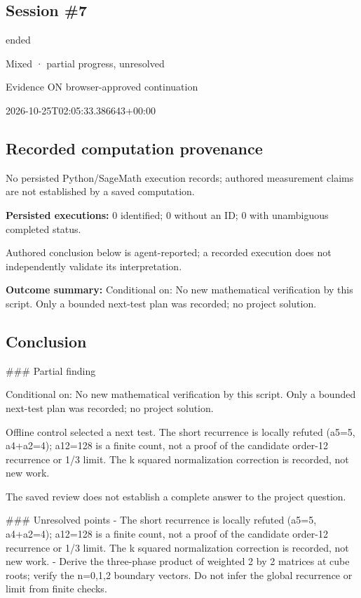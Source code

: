 \documentclass[11pt]{article}
\begin{document}
\subsection{Session \#7}
\begin{description}[style=nextline,font=\normalfont\bfseries,leftmargin=0pt,labelsep=0pt]
\item[Execution status] ended
\item[Outcome] Mixed · partial progress, unresolved
\item[Strategy] Evidence ON browser-approved continuation
\item[Started] 2026-10-25T02:05:33.386643+00:00
\end{description}
\subsection{Recorded computation provenance}
No persisted Python/SageMath execution records; authored measurement claims are not established by a saved computation.\par
\textbf{Persisted executions:} 0 identified; 0 without an ID; 0 with unambiguous completed status.\par
Authored conclusion below is agent-reported; a recorded execution does not independently validate its interpretation.\par
\textbf{Outcome summary:} Conditional on: No new mathematical verification by this script. Only a bounded next-test plan was recorded; no project solution.\par
\subsection{Conclusion}
\#\#\# Partial finding

Conditional on: No new mathematical verification by this script. Only a bounded next-test plan was recorded; no project solution.

Offline control selected a next test. The short recurrence is locally refuted (a5=5, a4+a2=4); a12=128 is a finite count, not a proof of the candidate order-12 recurrence or 1/3 limit. The k squared normalization correction is recorded, not new work.

The saved review does not establish a complete answer to the project question.

\#\#\# Unresolved points
- The short recurrence is locally refuted (a5=5, a4+a2=4); a12=128 is a finite count, not a proof of the candidate order-12 recurrence or 1/3 limit. The k squared normalization correction is recorded, not new work.
- Derive the three-phase product of weighted 2 by 2 matrices at cube roots; verify the n=0,1,2 boundary vectors. Do not infer the global recurrence or limit from finite checks.
\end{document}
